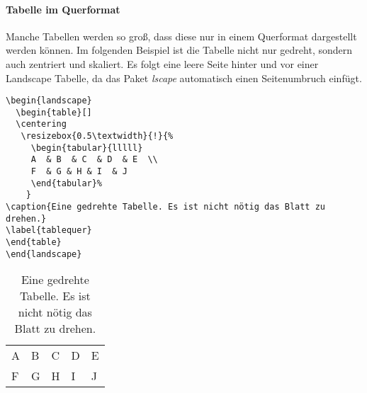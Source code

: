 	\begin{table}[h!]
		\centering
		\caption{Test Table}
		\label{tab:label_test}
	\end{table}
\paragraph{Tabelle im Querformat}

Manche Tabellen werden so groß, dass diese nur in einem Querformat dargestellt werden können. Im folgenden Beispiel ist die Tabelle nicht nur gedreht, sondern auch zentriert und skaliert. Es folgt eine leere Seite hinter und vor einer Landscape Tabelle, da das Paket \emph{lscape} automatisch einen Seitenumbruch einfügt. 
\bigskip
\begin{lstlisting}[style=Latex,caption={Einfache gedrehte Tabelle},label=lst:tab11]
\begin{landscape}
  \begin{table}[]
  \centering
   \resizebox{0.5\textwidth}{!}{%
     \begin{tabular}{lllll}
     A	& B  & C  & D  & E  \\
     F	& G & H & I  & J 
     \end{tabular}%
    }
\caption{Eine gedrehte Tabelle. Es ist nicht nötig das Blatt zu drehen.}
\label{tablequer}
\end{table}
\end{landscape}
\end{lstlisting}


\begin{landscape}
	\begin{table}[]
		\centering
			\begin{tabular}{l|l|l|l|l}
			A	& B  & C  & D  & E  \\
			F	& G & H & I  & J 
			\end{tabular}%
		\caption{Eine gedrehte Tabelle. Es ist nicht nötig das Blatt zu drehen.}
		\label{tablelscpe}
	\end{table}
\end{landscape}
